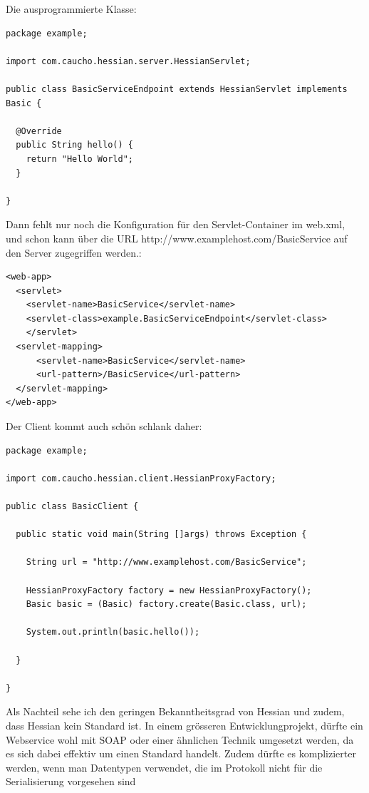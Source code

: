 \documentclass[abstracton, listof=totocnumbered,
bibliography=totocnumbered]{scrreprt}
\begin{document}
  Die ausprogrammierte Klasse:

\begin{verbatim}
package example;  
  
import com.caucho.hessian.server.HessianServlet;

public class BasicServiceEndpoint extends HessianServlet implements Basic {

  @Override
  public String hello() {
    return "Hello World";
  }
      
}
\end{verbatim}

  Dann fehlt nur noch die Konfiguration für den Servlet-Container im web.xml,
  und schon kann über die \ac{URL} http://www.examplehost.com/BasicService auf
  den Server zugegriffen werden.:
  
\begin{verbatim}
<web-app>  
  <servlet>
    <servlet-name>BasicService</servlet-name>
    <servlet-class>example.BasicServiceEndpoint</servlet-class>
    </servlet>
  <servlet-mapping>
      <servlet-name>BasicService</servlet-name>
      <url-pattern>/BasicService</url-pattern>
  </servlet-mapping>
</web-app>
\end{verbatim}

  Der Client kommt auch schön schlank daher:

\begin{verbatim}  
package example;

import com.caucho.hessian.client.HessianProxyFactory;

public class BasicClient {

  public static void main(String []args) throws Exception {
  
    String url = "http://www.examplehost.com/BasicService";

    HessianProxyFactory factory = new HessianProxyFactory();
    Basic basic = (Basic) factory.create(Basic.class, url);

    System.out.println(basic.hello());
    
  }
  
}
\end{verbatim}  
  
  Als Nachteil sehe ich den geringen Bekanntheitsgrad von Hessian und zudem,
  dass Hessian kein Standard ist. In einem grösseren Entwicklungprojekt, dürfte
  ein Webservice wohl mit \ac{SOAP} oder einer ähnlichen Technik umgesetzt
  werden, da es sich dabei effektiv um einen Standard handelt. Zudem dürfte es
  komplizierter werden, wenn man Datentypen verwendet, die im Protokoll nicht
  für die Serialisierung vorgesehen sind
  
\end{document}
